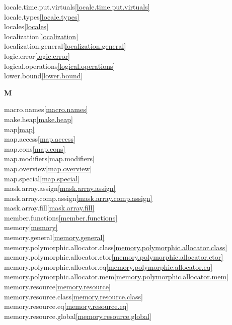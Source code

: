 \begin{multicols}{2}
locale.time.put.virtuals\quad\ref{locale.time.put.virtuals}\\
locale.types\quad\ref{locale.types}\\
locales\quad\ref{locales}\\
localization\quad\ref{localization}\\
localization.general\quad\ref{localization.general}\\
logic.error\quad\ref{logic.error}\\
logical.operations\quad\ref{logical.operations}\\
lower.bound\quad\ref{lower.bound}\\
\par \textbf{M}\par
macro.names\quad\ref{macro.names}\\
make.heap\quad\ref{make.heap}\\
map\quad\ref{map}\\
map.access\quad\ref{map.access}\\
map.cons\quad\ref{map.cons}\\
map.modifiers\quad\ref{map.modifiers}\\
map.overview\quad\ref{map.overview}\\
map.special\quad\ref{map.special}\\
mask.array.assign\quad\ref{mask.array.assign}\\
mask.array.comp.assign\quad\ref{mask.array.comp.assign}\\
mask.array.fill\quad\ref{mask.array.fill}\\
member.functions\quad\ref{member.functions}\\
memory\quad\ref{memory}\\
memory.general\quad\ref{memory.general}\\
memory.polymorphic.allocator.class\quad\ref{memory.polymorphic.allocator.class}\\
memory.polymorphic.allocator.ctor\quad\ref{memory.polymorphic.allocator.ctor}\\
memory.polymorphic.allocator.eq\quad\ref{memory.polymorphic.allocator.eq}\\
memory.polymorphic.allocator.mem\quad\ref{memory.polymorphic.allocator.mem}\\
memory.resource\quad\ref{memory.resource}\\
memory.resource.class\quad\ref{memory.resource.class}\\
memory.resource.eq\quad\ref{memory.resource.eq}\\
memory.resource.global\quad\ref{memory.resource.global}\\

\end{multicols}
